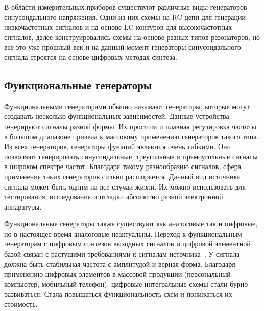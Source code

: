	В области измерительных приборов существуют различные виды генераторов синусоидального напряжения. Одни из них схемы на RC-цепи для генерации низкочастотных сигналов и на основе LC-контуров для высокочастотных сигналов, далее конструировались схемы на основе разных типов резонаторов, но всё это уже прошлый век и на данный момент генераторы синусоидального сигнала строятся на основе цифровых методах синтеза.



\subsection{Функциональные генераторы}
	Функциональными генераторами обычно называют генераторы, которые могут создавать несколько функциональных зависимостей. Данные устройства генерируют сигналы разной формы. Их простота и плавная регулировка частоты в большом диапазоне привела к массовому применению генераторов такого типа. Из всех генераторов, генераторы функций являются очень гибкими. Они позволяют генерировать синусоидальные, треугольные и прямоугольные сигналы в широком спектре частот. Благодаря такому разнообразию сигналов, сфера применения таких генераторов сильно расширяется. Данный вид источника сигнала может быть одним на все случаи жизни. Их можно использовать для тестирования, исследования и отладки абсолютно разной электронной аппаратуры.

	Функциональные генераторы также существуют как аналоговые так и цифровые, но в настоящее время аналоговые неактуальны. Переход к функциональным генераторам с цифровым синтезов выходных сигналов и цифровой элементной базой связан с растущими требованиями к сигналам источника~\cite{dgs}. У сигнала должна быть стабильная частота с амплитудой и верная форма. Благодаря применению цифровых элементов в массовой продукции (персональный компьютер, мобильный телефон), цифровые интегральные схемы стали бурно развиваться. Стала повышаться функциональность схем и понижаться их стоимость.

